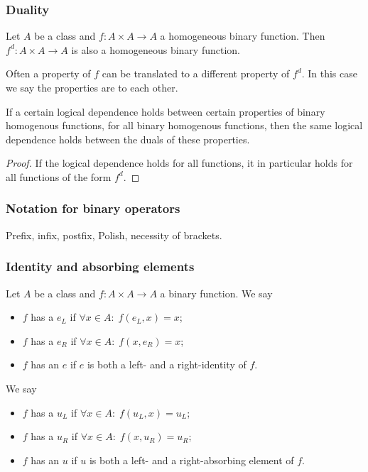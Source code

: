\subsubsection{Duality}
Let $A$ be a class and $f: A\times A \to A$ a homogeneous binary function. Then $f^d: A\times A \to A$ is also a homogeneous binary function.

Often a property of $f$ can be translated to a different property of $f^d$. In this case we say the properties are  to each other.

\begin{proposition}
If a certain logical dependence holds between certain properties of binary homogenous functions, for all binary homogenous functions, then the same logical dependence holds between the duals of these properties.
\end{proposition}
\begin{proof}
If the logical dependence holds for all functions, it in particular holds for all functions of the form $f^d$.
\end{proof}

\subsubsection{Notation for binary operators}
Prefix, infix, postfix, Polish, necessity of brackets.

\subsubsection{Identity and absorbing elements}
\begin{definition}
Let $A$ be a class and $f: A\times A \to A$ a binary function. 
We say
\begin{itemize}
\item $f$ has a  $e_L$ if $\forall x\in A:\; f(e_L, x) = x$;
\item $f$ has a  $e_R$ if $\forall x\in A:\; f(x, e_R) = x$;
\item $f$ has an  $e$ if $e$ is both a left- and a right-identity of $f$.
\end{itemize}
We say
\begin{itemize}
\item $f$ has a  $u_L$ if $\forall x\in A:\; f(u_L, x) = u_L$;
\item $f$ has a  $u_R$ if $\forall x\in A:\; f(x, u_R) = u_R$;
\item $f$ has an  $u$ if $u$ is both a left- and a right-absorbing element of $f$.
\end{itemize}
\end{definition}

